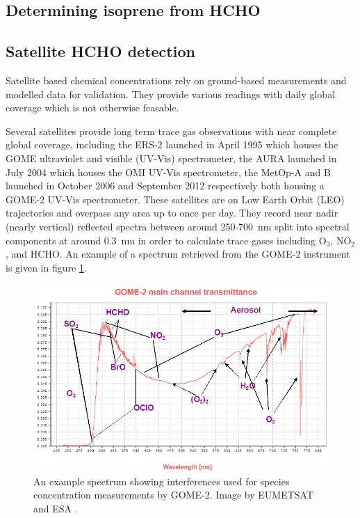   \subsection{Determining isoprene from HCHO}
  \subsection{Satellite HCHO detection}
    Satellite based chemical concentrations rely on ground-based measurements and modelled data for validation.
    They provide various readings with daily global coverage which is not otherwise feasable.
    
    Several satellites provide long term trace gas observations with near complete global coverage, including the ERS-2 launched in April 1995 which houses the GOME ultraviolet and visible (UV-Vis) spectrometer, the AURA launched in July 2004 which houses the OMI UV-Vis spectrometer, the MetOp-A and B launched in October 2006 and September 2012 respectively both housing a GOME-2 UV-Vis spectrometer.
    These satellites are on Low Earth Orbit (LEO) trajectories and overpass any area up to once per day. 
    They record near nadir (nearly vertical) reflected spectra between around 250-700~nm split into spectral components at around $0.3$~nm in order to calculate trace gases including O$_3$, NO$_2$, and HCHO.
    An example of a spectrum retrieved from the GOME-2 instrument is given in figure \ref{LR:fig:gomeproducts}.
    
    \begin{figure}
      \includegraphics[width=\textwidth]{Figures/GOME_SPECTRUM.jpg}
      \caption{An example spectrum showing interferences used for species concentration measurements by GOME-2. Image by EUMETSAT and ESA \citep{GOME2Image}.}
      \label{LR:fig:gomeproducts}
    \end{figure}
    
